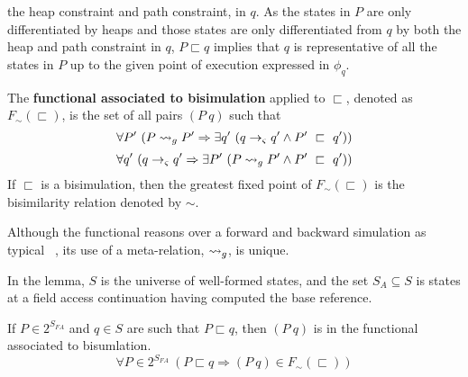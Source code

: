 the heap constraint and path constraint, in $q$. As the states in $P$
are only differentiated by heaps and those states are only
differentiated from $q$ by both the heap and path constraint in $q$,
$P \sqsubset q$ implies that $q$ is representative of all the states
in $P$ up to the given point of execution expressed in $\phi_q$.
\begin{definition}
\label{bisimulation}
The \textbf{functional associated to bisimulation} applied to $\sqsubset$, denoted as $F_\sim(\sqsubset)$, is the set of all pairs
$(P\ q)$ such that
\begin{equation}
\label{eqn:BisimulationForwards}
\forall P^\prime\ ( P \rsgse P^\prime \Rightarrow \exists q^\prime\ ( q \rsym q^\prime \wedge P^\prime\ \sqsubset\ q^\prime))
\end{equation}
\begin{equation}
\label{eqn:BisimulationBackwards}
\forall q^\prime\ ( q \rsym q^\prime\Rightarrow \exists P^\prime\ ( P \rsgse P^\prime \wedge P^\prime\ \sqsubset\ q^\prime))
\end{equation}
If $\sqsubset$ is a bisimulation, then the greatest fixed point of $F_\sim(\sqsubset)$ is the bisimilarity relation denoted by $\sim$.
\end{definition}
Although the functional reasons over a forward and backward
simulation as typical~ \cite{Sangiorgi:2011}, its use of a meta-relation, $\leadsto_{g}$, is unique. 

In the lemma, $S$ is the universe of well-formed states, and the
set $S_A \subseteq S$ is states at a field access continuation having computed the base reference.
\begin{lemma}
If $P \in 2^{S_\mathit{FA}}$ and $q \in S$ are such that $P \sqsubset q$, then $(P\ q)$ is in the functional associated to bisumlation.
\label{lem:access}
$$
\forall P \in 2^{S_\mathit{FA}}\ (P \sqsubset q \Rightarrow (P\ q) \in F_\sim(\sqsubset))
$$
\end{lemma}

